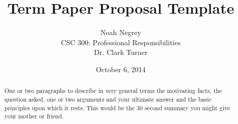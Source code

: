 \documentclass[12pt]{article}
\begin{document}
\title{\vfill Term Paper Proposal Template} %
\author{
Noah Negrey \vspace{10pt} \\
\small CSC 300: Professional Responsibilities \\
\small Dr. Clark Turner \\
}
\date{October 6, 2014} %

\maketitle

\vfill  %
\begin{abstract}
One or two paragraphs to describe in very general terms the motivating facts, the question asked, one or two arguments and your ultimate answer and the basic principles upon which it rests. This would be the 30 second summary you might give your mother or friend. %
\end{abstract}

\thispagestyle{empty} %
\newpage


\tableofcontents

\thispagestyle{empty}  %
\newpage
\end{document}
